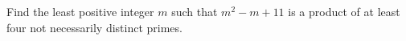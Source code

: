 Find the least positive integer $m$ such that $m^2 - m + 11$ is a product of at least four not necessarily distinct primes.